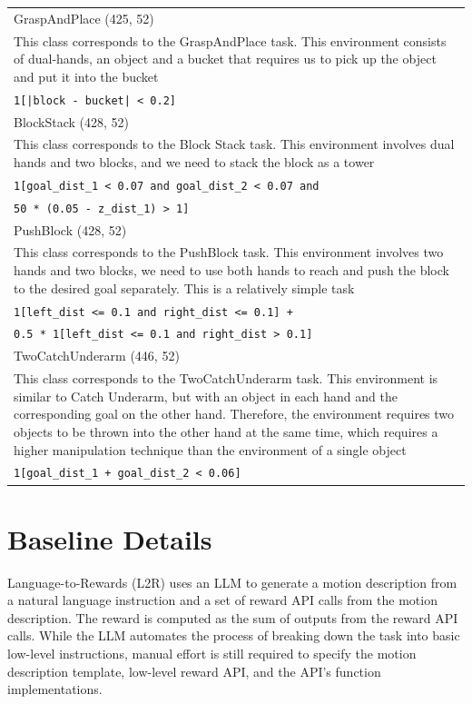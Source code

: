 \begin{tabularx}{\textwidth}{X}
    \hline
    GraspAndPlace (425, 52) \\ This class corresponds to the GraspAndPlace task. This environment consists of dual-hands, an object and a bucket that requires us to pick up the object and put it into the bucket \\ \verb+1[|block - bucket| < 0.2]+ \\[1px]
    \hline
    BlockStack (428, 52) \\ This class corresponds to the Block Stack task. This environment involves dual hands and two blocks, and we need to stack the block as a tower \\ \verb|1[goal_dist_1 < 0.07 and goal_dist_2 < 0.07 and| \\ \verb|50 * (0.05 - z_dist_1) > 1]| \\[1px]
    \hline
    PushBlock (428, 52) \\ This class corresponds to the PushBlock task. This environment involves two hands and two blocks, we need to use both hands to reach and push the block to the desired goal separately. This is a  relatively simple task \\ \verb|1[left_dist <= 0.1 and right_dist <= 0.1] +| \\ \verb|0.5 * 1[left_dist <= 0.1 and right_dist > 0.1]| \\[1px]
    \hline
    TwoCatchUnderarm (446, 52) \\ This class corresponds to the TwoCatchUnderarm task. This environment is similar to Catch Underarm,  but with an object in each hand and the corresponding goal on the other hand. Therefore, the  environment requires two objects to be thrown into the other hand at the same time, which requires  a higher manipulation technique than the environment of a single object \\ \verb|1[goal_dist_1 + goal_dist_2 < 0.06]| \\[1px]
    \bottomrule
\end{tabularx}

\section{Baseline Details}
\label{appendix:baseline-details}
Language-to-Rewards (L2R) uses an LLM to generate a motion description from a natural language instruction and a set of reward API calls from the motion description. The reward is computed as the sum of outputs from the reward API calls. While the LLM automates the process of breaking down the task into basic low-level instructions, manual effort is still required to specify the motion description template, low-level reward API, and the API's function implementations.

